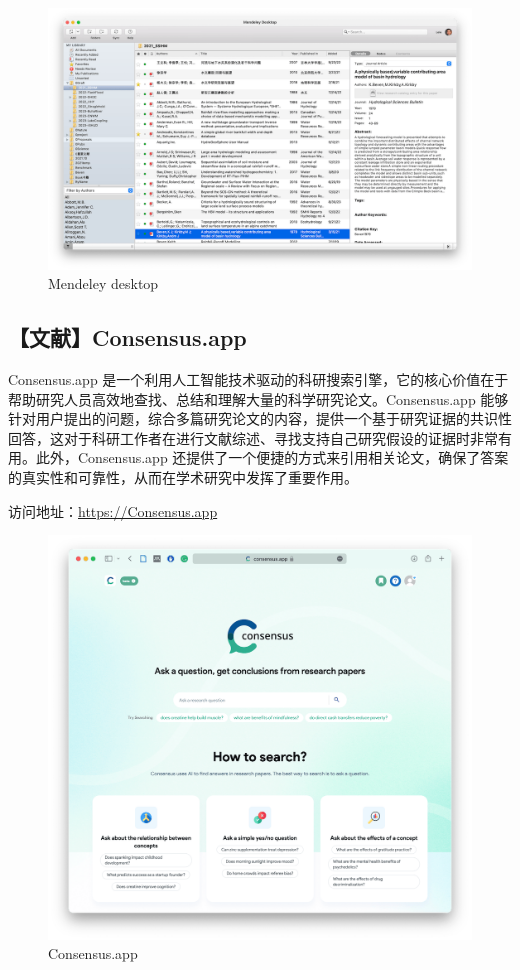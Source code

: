 \documentclass[
]{ctexbook}
\begin{document}
\begin{figure}
\centering
\includegraphics{Fig/skill/mendeley.png}
\caption{Mendeley desktop}
\end{figure}

\hypertarget{ux6587ux732econsensus.app}{%
\subsection{【文献】Consensus.app}\label{ux6587ux732econsensus.app}}

Consensus.app 是一个利用人工智能技术驱动的科研搜索引擎，它的核心价值在于帮助研究人员高效地查找、总结和理解大量的科学研究论文。Consensus.app 能够针对用户提出的问题，综合多篇研究论文的内容，提供一个基于研究证据的共识性回答，这对于科研工作者在进行文献综述、寻找支持自己研究假设的证据时非常有用。此外，Consensus.app 还提供了一个便捷的方式来引用相关论文，确保了答案的真实性和可靠性，从而在学术研究中发挥了重要作用。

访问地址：\url{https://Consensus.app}

\begin{figure}
\centering
\includegraphics{Fig/skill/consensus.png}
\caption{Consensus.app}
\end{figure}
\end{document}

